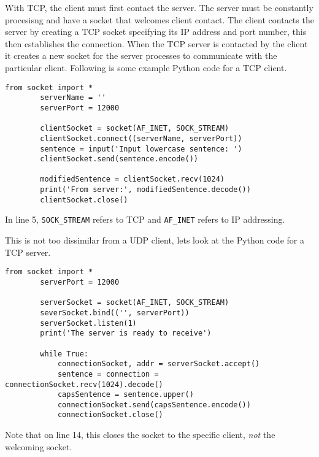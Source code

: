 \begin{example}
    With TCP, the client must first contact the server. 
    The server must be constantly procesisng and have a socket that welcomes client contact.
    The client contacts the server by creating a TCP socket specifying its IP address and port number, this then establishes the connection.
    When the TCP server is contacted by the client it creates a new socket for the server processes to communicate with the particular client.
    Following is some example Python code for a TCP client.
    \begin{lstlisting}[gobble=8]
        from socket import *
        serverName = ''
        serverPort = 12000
        
        clientSocket = socket(AF_INET, SOCK_STREAM)
        clientSocket.connect((serverName, serverPort))
        sentence = input('Input lowercase sentence: ')
        clientSocket.send(sentence.encode())

        modifiedSentence = clientSocket.recv(1024)
        print('From server:', modifiedSentence.decode())
        clientSocket.close()
    \end{lstlisting}
    In line 5, \texttt{SOCK\_STREAM} refers to TCP and \texttt{AF\_INET} refers to IP addressing.

    This is not too dissimilar from a UDP client, lets look at the Python code for a TCP server.
    \begin{lstlisting}[gobble=8]
        from socket import *
        serverPort = 12000

        serverSocket = socket(AF_INET, SOCK_STREAM)
        severSocket.bind(('', serverPort))
        serverSocket.listen(1)
        print('The server is ready to receive')

        while True:
            connectionSocket, addr = serverSocket.accept()
            sentence = connection = connectionSocket.recv(1024).decode()
            capsSentence = sentence.upper()
            connectionSocket.send(capsSentence.encode())
            connectionSocket.close()
    \end{lstlisting}
    Note that on line 14, this closes the socket to the specific client, \emph{not} the welcoming socket.
\end{example}
